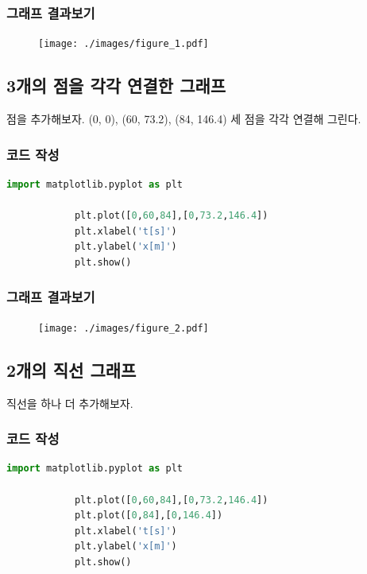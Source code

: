 \documentclass[12pt]{article}
\begin{document}
			\subsubsection{그래프 결과보기}
			\begin{figure}[h]
				\begin{center}
					\texttt{[image: ./images/figure\_1.pdf]}
				\end{center}
			\end{figure}
		
		\clearpage
		\subsection{3개의 점을 각각 연결한 그래프}
		점을 추가해보자. (0, 0), (60, 73.2), (84, 146.4) 세 점을 각각 연결해 그린다.
			\subsubsection{코드 작성}
			\begin{lstlisting}[style=pstyle, language=Python, caption=3 point]
			import matplotlib.pyplot as plt
			
			plt.plot([0,60,84],[0,73.2,146.4])
			plt.xlabel('t[s]')
			plt.ylabel('x[m]')
			plt.show()\end{lstlisting}
			\subsubsection{그래프 결과보기}
			\begin{figure}[h]
				\begin{center}
					\texttt{[image: ./images/figure\_2.pdf]}
				\end{center}
			\end{figure}
		
		\clearpage
		\subsection{2개의 직선 그래프}
			직선을 하나 더 추가해보자.
			\subsubsection{코드 작성}
			\begin{lstlisting}[style=pstyle, language=Python, caption=2 line]
			import matplotlib.pyplot as plt
			
			plt.plot([0,60,84],[0,73.2,146.4])
			plt.plot([0,84],[0,146.4])
			plt.xlabel('t[s]')
			plt.ylabel('x[m]')
			plt.show()\end{lstlisting}
\end{document}
